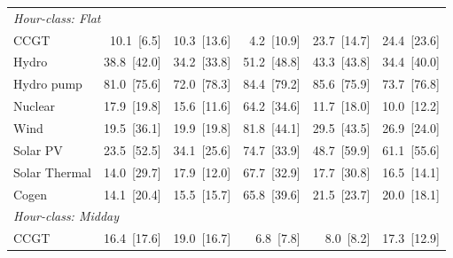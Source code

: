 \begin{tabular}{l r r r r r}
\midrule
\multicolumn{6}{l}{\textit{Hour-class: Flat}} \\
CCGT & 10.1~{\color{seasoncol}\scriptsize[6.5]} & 10.3~{\color{seasoncol}\scriptsize[13.6]} & 4.2~{\color{seasoncol}\scriptsize[10.9]} & 23.7~{\color{seasoncol}\scriptsize[14.7]} & 24.4~{\color{seasoncol}\scriptsize[23.6]} \\
Hydro & 38.8~{\color{seasoncol}\scriptsize[42.0]} & 34.2~{\color{seasoncol}\scriptsize[33.8]} & 51.2~{\color{seasoncol}\scriptsize[48.8]} & 43.3~{\color{seasoncol}\scriptsize[43.8]} & 34.4~{\color{seasoncol}\scriptsize[40.0]} \\
Hydro pump & 81.0~{\color{seasoncol}\scriptsize[75.6]} & 72.0~{\color{seasoncol}\scriptsize[78.3]} & 84.4~{\color{seasoncol}\scriptsize[79.2]} & 85.6~{\color{seasoncol}\scriptsize[75.9]} & 73.7~{\color{seasoncol}\scriptsize[76.8]} \\
Nuclear & 17.9~{\color{seasoncol}\scriptsize[19.8]} & 15.6~{\color{seasoncol}\scriptsize[11.6]} & 64.2~{\color{seasoncol}\scriptsize[34.6]} & 11.7~{\color{seasoncol}\scriptsize[18.0]} & 10.0~{\color{seasoncol}\scriptsize[12.2]} \\
Wind & 19.5~{\color{seasoncol}\scriptsize[36.1]} & 19.9~{\color{seasoncol}\scriptsize[19.8]} & 81.8~{\color{seasoncol}\scriptsize[44.1]} & 29.5~{\color{seasoncol}\scriptsize[43.5]} & 26.9~{\color{seasoncol}\scriptsize[24.0]} \\
Solar PV & 23.5~{\color{seasoncol}\scriptsize[52.5]} & 34.1~{\color{seasoncol}\scriptsize[25.6]} & 74.7~{\color{seasoncol}\scriptsize[33.9]} & 48.7~{\color{seasoncol}\scriptsize[59.9]} & 61.1~{\color{seasoncol}\scriptsize[55.6]} \\
Solar Thermal & 14.0~{\color{seasoncol}\scriptsize[29.7]} & 17.9~{\color{seasoncol}\scriptsize[12.0]} & 67.7~{\color{seasoncol}\scriptsize[32.9]} & 17.7~{\color{seasoncol}\scriptsize[30.8]} & 16.5~{\color{seasoncol}\scriptsize[14.1]} \\
Cogen & 14.1~{\color{seasoncol}\scriptsize[20.4]} & 15.5~{\color{seasoncol}\scriptsize[15.7]} & 65.8~{\color{seasoncol}\scriptsize[39.6]} & 21.5~{\color{seasoncol}\scriptsize[23.7]} & 20.0~{\color{seasoncol}\scriptsize[18.1]} \\
\midrule
\multicolumn{6}{l}{\textit{Hour-class: Midday}} \\
CCGT & 16.4~{\color{seasoncol}\scriptsize[17.6]} & 19.0~{\color{seasoncol}\scriptsize[16.7]} & 6.8~{\color{seasoncol}\scriptsize[7.8]} & 8.0~{\color{seasoncol}\scriptsize[8.2]} & 17.3~{\color{seasoncol}\scriptsize[12.9]} \\

\end{tabular}
